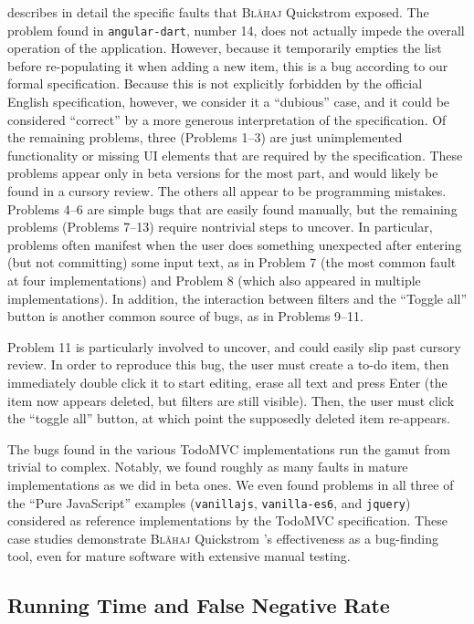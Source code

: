 \documentclass[sigplan,nonacm,10pt]{acmart}
\makeatletter
\newcommand{\Quickstrom}[0]{%
  \if@ACM@anonymous%
  \textsc{Bl\aa{}haj}%
  \else%
  Quickstrom%
  \fi\xspace}
\makeatother
\begin{document}
 describes in detail the specific faults that \Quickstrom exposed. The problem found in \texttt{angular-dart}, number 14, does not actually impede the overall operation of the application.
However, because it temporarily empties the list before re-populating it when adding a new item, this is a bug according to our formal specification. Because this is not explicitly forbidden by the official English specification, however, we consider it
a ``dubious'' case, and it could be considered ``correct'' by a more generous interpretation of the specification.
Of the remaining problems, three (Problems 1--3) are just unimplemented functionality or missing UI elements that are required by the specification. These problems appear
only in beta versions for the most part, and would likely be found in a cursory review.
The others all appear to be programming mistakes. Problems 4--6 are simple bugs that are easily found manually,  but the remaining problems (Problems 7--13) require nontrivial steps to uncover. In particular, problems often manifest when the user
does something unexpected after entering (but not committing) some input text, as in Problem 7 (the most common fault at four implementations) and Problem 8 (which also appeared in multiple implementations).
In addition, the interaction between filters and the ``Toggle all'' button is another common source of bugs, as in Problems 9--11.

Problem 11 is particularly involved to uncover, and could easily slip past cursory review. In order to reproduce this bug, the user must
create a to-do item, then immediately double click it to start editing, erase all text and press Enter (the item now appears deleted, but filters are still visible). Then, the user must
click the ``toggle all'' button, at which point the supposedly deleted item re-appears.

The bugs found in the various TodoMVC implementations run the gamut from trivial to complex. Notably, we found roughly as many faults in mature implementations as we did in beta ones.
We even found problems in all three of the ``Pure JavaScript'' examples (\texttt{vanillajs}, \texttt{vanilla-es6}, and \texttt{jquery}) considered as reference implementations by the TodoMVC specification.
These case studies demonstrate \Quickstrom's effectiveness as a bug-finding tool, even for mature software with extensive manual testing.

\subsection{Running Time and False Negative Rate}
\label{ssec:timing}
\end{document}
